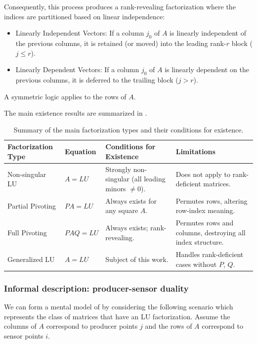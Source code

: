 \documentclass[10pt,twoside]{siamart1116}
\numberwithin{theorem}{section}
\begin{document}
Consequently, this process produces a rank-revealing factorization where the indices are partitioned based on linear independence:
\begin{itemize}
  \item Linearly Independent Vectors: If a column $j_0$ of $A$ is linearly independent of the previous columns, it is retained (or moved) into the leading rank-$r$ block ($j \le r$).
  \item Linearly Dependent Vectors: If a column $j_0$ of $A$ is linearly dependent on the previous columns, it is deferred to the trailing block ($j > r$).
\end{itemize}
A symmetric logic applies to the rows of $A$.

The main existence results are summarized in .

\begin{table}[htbp]
  \centering
  \begin{tabular}{llp{4cm}p{6cm}}
    \toprule
    Factorization Type & Equation & Conditions for Existence & Limitations \\
    \midrule
    Non-singular LU & $A=LU$ & Strongly non-singular (all leading minors $\neq 0$). & Does not apply to rank-deficient matrices. \\
    Partial Pivoting & $PA=LU$ & \raggedright Always exists for any square $A$. & \raggedright Permutes rows, altering row-index meaning.\tabularnewline
    Full Pivoting & $PAQ=LU$ & \raggedright Always exists; rank-revealing. & \raggedright Permutes rows and columns, destroying all index structure.\tabularnewline
    Generalized LU & $A=LU$ & Subject of this work. & \raggedright Handles rank-deficient cases without $P$, $Q$.\tabularnewline
    \bottomrule
  \end{tabular}
  \caption{Summary of the main factorization types and their conditions for existence.}\label{tab:main}
\end{table}

\subsubsection*{Informal description: producer-sensor duality}

We can form a mental model of  by considering the following scenario which represents the class of matrices that have an LU factorization. Assume the columns of $A$ correspond to producer points $j$ and the rows of $A$ correspond to sensor points $i$.
\end{document}
